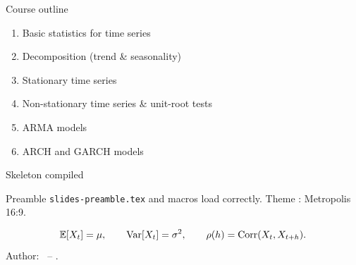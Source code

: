 \documentclass[aspectratio=169]{beamer}
\title[\moduleNom]{\moduleNom}
\subtitle{Skeleton compile test --- Step 1}
\author{\auteurNom \\ \footnotesize\auteurEmail}
\institute{\auteurInstitution}
\date{\anneeUniversitaire}
\begin{document}
\begin{frame}\titlepage\end{frame}

\begin{frame}{Course outline}
  \begin{enumerate}
    \item Basic statistics for time series
    \item Decomposition (trend \& seasonality)
    \item Stationary time series
    \item Non-stationary time series \& unit-root tests
    \item ARMA models
    \item ARCH and GARCH models
  \end{enumerate}
\end{frame}

\begin{frame}{Skeleton compiled}
  \begin{infobox}
    Preamble \texttt{slides-preamble.tex} and macros load correctly.
    Theme : Metropolis 16:9.
  \end{infobox}
  \[
    \mathbb{E}[X_t] = \mu, \qquad \mathrm{Var}[X_t] = \sigma^2, \qquad \rho(h) = \mathrm{Corr}(X_t, X_{t+h}).
  \]
  Author: \auteurNom\ -- \auteurEmail.
\end{frame}
\end{document}
